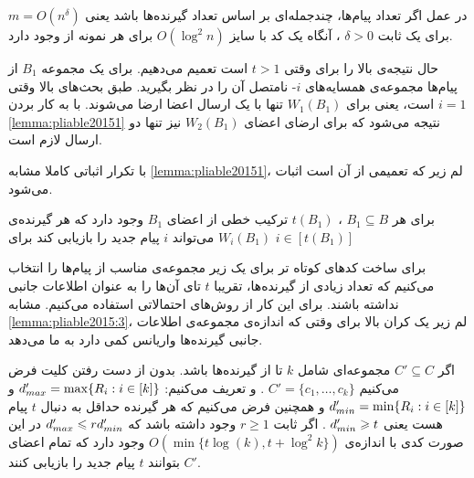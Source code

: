 \begin{corollary}
در عمل اگر تعداد پیام‌ها، چندجمله‌ای بر اساس تعداد گیرنده‌ها باشد یعنی
$m = O(n^{\delta})$
برای یک ثابت
$\delta > 0$
، آنگاه یک کد با سایز
$O(\log^2 n)$
برای هر نمونه از
وجود دارد.
\end{corollary}

حال نتیجه‌ی بالا را برای 
وقتی
$t > 1$
است تعمیم می‌دهیم. برای یک مجموعه
$B_1$
از پیام‌ها مجموعه‌ی همسایه‌های
$i$-
نامتصل آن را در نظر بگیرید. طبق بحث‌های بالا وقتی
$i = 1$
است، یعنی برای
$W_1(B_1)$
تنها با یک ارسال اعضا ارضا می‌شوند. با به کار بردن
\autoref{lemma:pliable20151}
نتیجه می‌شود که برای ارضای اعضای
$W_2(B_1)$
نیز تنها دو ارسال لازم است.

با تکرار اثباتی کاملا مشابه
\autoref{lemma:pliable20151}،
لم زیر که تعمیمی از آن است اثبات می‌شود.
\begin{lemma}
	برای هر
	$B_1 \subseteq B$
	، 
	$t(B_1)$
	ترکیب خطی از اعضای
	$B_1$
	وجود دارد که هر گیرنده‌ی
	$W_i(B_1)$
	می‌تواند
	$i$
	پیام جدید را بازیابی کند برای
	$i \in [t(B_1)]$
\end{lemma}
برای ساخت کدهای کوتاه تر برای
یک زیر مجموعه‌ی مناسب از پیام‌ها را انتخاب می‌کنیم که تعداد زیادی از گیرنده‌ها، تقریبا
$t$
تای آن‌ها را به عنوان اطلاعات جانبی نداشته باشند. برای این کار از روش‌های احتمالاتی استفاده می‌کنیم. مشابه
\autoref{lemma:pliable2015:3}،
لم زیر یک کران بالا برای وقتی که اندازه‌ی مجموعه‌ی اطلاعات جانبی گیرنده‌ها واریانس کمی دارد به ما می‌دهد.
\begin{lemma}
	\label{lemma:pliable2015:6}
	اگر
	$C' \subseteq C$
	مجموعه‌ای شامل 
	$k$
	تا از گیرنده‌‌ها باشد. بدون از دست رفتن کلیت فرض می‌کنیم
	$C' = \{c_1, \ldots, c_k\}$
	. و تعریف می‌کنیم:
	$d_{max}' = \max\{R_i: i \in [k] \}$
	و
	$d_{min}' = \min\{R_i: i \in [k] \}$
	و همچنین فرض می‌کنیم که هر گیرنده حداقل به دنبال 
	$t$
	پیام هست یعنی
	$d_{min}' \geqslant t$
	. اگر ثابت
	$r \geq 1$
	وجود داشته باشد که
	$d_{max}' \leqslant r d_{min}'$
	در این صورت کدی با اندازه‌ی
	$O(\min\{t \log(k), t + \log^2 k\})$
	وجود دارد که تمام اعضای
	$C'$
	بتوانند
	$t$
	پیام جدید را بازیابی کنند.
\end{lemma}
